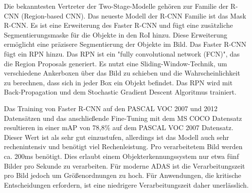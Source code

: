 Die bekanntesten Vertreter der Two-Stage-Modelle gehören zur Familie der R-CNN (Region-based \acl{CNN}). Das neueste Modell der R-CNN Familie ist das Mask R-CNN. Es ist eine Erweiterung des Faster R-CNN und fügt eine zusätzliche Segmentierungsmaske für die Objekte in den \ac{RoI} hinzu. Diese Erweiterung ermöglicht eine präzisere Segmentierung der Objekte im Bild. \cite{MaskRCNN} Das Faster R-CNN fügt ein \ac{RPN} hinzu. Das \ac{RPN} ist ein "fully convolutional network (FCN)"\cite{FasterRCNN}, das die Region Proposals generiert. Es nutzt eine Sliding-Window-Technik, um verschiedene Ankerboxen über das Bild zu schieben und die Wahrscheinlichkeit zu berechnen, dass sich in jeder Box ein Objekt befindet. Das \ac{RPN} wird mit Back-Propagation und dem Stochastic Gradient Descent Algoritmus trainiert. \cite{FasterRCNN} 

Das Training von Faster R-CNN auf den PASCAL VOC 2007 und 2012 Datensätzen und das anschließende Fine-Tuning mit dem MS COCO Datensatz resultieren in einer \ac{mAP} von 78,8\% auf dem PASCAL VOC 2007 Datensatz. Dieser Wert ist als sehr gut einzustufen, allerdings ist das Modell auch sehr rechenintensiv und benötigt viel Rechenleistung. Pro verarbeitetem Bild werden ca. 200ms benötigt. Dies erlaubt einem Objekterkennungssystem nur etwa fünf Bilder pro Sekunde zu verarbeiten. \cite{FasterRCNN} Für moderne \ac{ADAS} ist die Verarbeitungszeit pro Bild jedoch um Größenordnungen zu hoch. Für Anwendungen, die kritische Entscheidungen erfordern, ist eine niedrigere Verarbeitungszeit daher unerlässlich.
